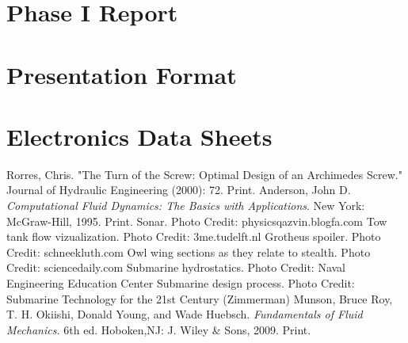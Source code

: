 \documentclass{report}
\begin{document}
\chapter{Phase I Report}
%
\chapter{Presentation Format}
\chapter{Electronics Data Sheets}
%
\begin{thebibliography}{9}
Rorres, Chris. "The Turn of the Screw: Optimal Design of an Archimedes Screw." Journal of Hydraulic Engineering (2000): 72. Print.
Anderson, John D. \textit{Computational Fluid Dynamics: The Basics with Applications}. New York: McGraw-Hill, 1995. Print.
Sonar. Photo Credit: physicsqazvin.blogfa.com
Tow tank flow vizualization. Photo Credit: 3me.tudelft.nl
Grotheus spoiler. Photo Credit: schneekluth.com
Owl wing sections as they relate to stealth. Photo Credit: sciencedaily.com
Submarine hydrostatics. Photo Credit: Naval Engineering Education Center
Submarine design process. Photo Credit: Submarine Technology for the 21st Century (Zimmerman) 
Munson, Bruce Roy, T. H. Okiishi, Donald Young, and Wade Huebsch. \textit{Fundamentals of Fluid Mechanics.} 6th ed. Hoboken,NJ: J. Wiley \& Sons, 2009. Print.
\end{thebibliography}
\end{document}
